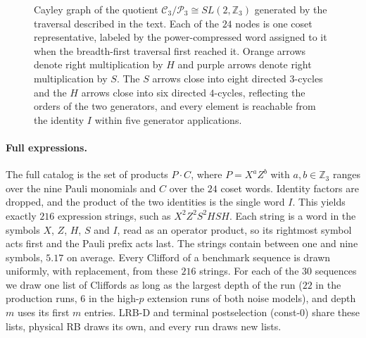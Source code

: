 \begin{figure}[H]
{
  }
  \caption{Cayley graph of the quotient $\mathcal{C}_3/\mathcal{P}_3 \cong SL(2,\mathbb{Z}_3)$ generated by the traversal described in the text. Each of the $24$ nodes is one coset representative, labeled by the power-compressed word assigned to it when the breadth-first traversal first reached it. Orange arrows denote right multiplication by $H$ and purple arrows denote right multiplication by $S$. The $S$ arrows close into eight directed $3$-cycles and the $H$ arrows close into six directed $4$-cycles, reflecting the orders of the two generators, and every element is reachable from the identity $I$ within five generator applications.}
  \label{fig:cayley-c3modp3}
\end{figure}


\paragraph{Full expressions.}
The full catalog is the set of products $P \cdot C$, where $P = X^a Z^b$ with $a, b \in \mathbb{Z}_3$ ranges over the nine Pauli monomials and $C$ over the $24$ coset words. Identity factors are dropped, and the product of the two identities is the single word $I$. This yields exactly $216$ expression strings, such as $X^2Z^2S^2HSH$. Each string is a word in the symbols $X$, $Z$, $H$, $S$ and $I$, read as an operator product, so its rightmost symbol acts first and the Pauli prefix acts last. The strings contain between one and nine symbols, $5.17$ on average. Every Clifford of a benchmark sequence is drawn uniformly, with replacement, from these $216$ strings. For each of the $30$ sequences we draw one list of Cliffords as long as the largest depth of the run ($22$ in the production runs, $6$ in the high-$p$ extension runs of both noise models), and depth $m$ uses its first $m$ entries. LRB-D and terminal postselection (const-0) share these lists, physical RB draws its own, and every run draws new lists.

